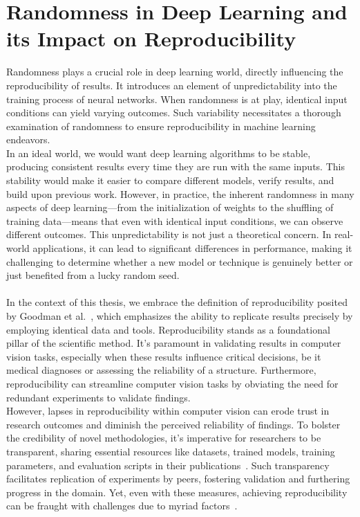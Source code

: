\section{Randomness in Deep Learning and its Impact on Reproducibility}
Randomness plays a crucial role in deep learning world, directly influencing the reproducibility of results. It introduces an element of unpredictability into the training process of neural networks. When randomness is at play, identical input conditions can yield varying outcomes. Such variability necessitates a thorough examination of randomness to ensure reproducibility in machine learning endeavors.\\

In an ideal world, we would want deep learning algorithms to be stable, producing consistent results every time they are run with the same inputs. This stability would make it easier to compare different models, verify results, and build upon previous work. However, in practice, the inherent randomness in many aspects of deep learning—from the initialization of weights to the shuffling of training data—means that even with identical input conditions, we can observe different outcomes. This unpredictability is not just a theoretical concern. In real-world applications, it can lead to significant differences in performance, making it challenging to determine whether a new model or technique is genuinely better or just benefited from a lucky random seed.\\
\\

In the context of this thesis, we embrace the definition of reproducibility posited by Goodman et al.~\cite{goodman:2016ca}, 
which emphasizes the ability to replicate results precisely by employing identical data and tools. Reproducibility stands 
as a foundational pillar of the scientific method. It's paramount in validating results in computer vision tasks, 
especially when these results influence critical decisions, be it medical diagnoses or assessing the reliability of a structure. 
Furthermore, reproducibility can streamline computer vision tasks by obviating the need for redundant experiments to validate 
findings.
\\

However, lapses in reproducibility within computer vision can erode trust in research outcomes and diminish the perceived 
reliability of findings. To bolster the credibility of novel methodologies, it's imperative for researchers to be transparent, 
sharing essential resources like datasets, trained models, training parameters, and evaluation scripts in their publications~\cite{haibe2020transparency}. 
Such transparency facilitates replication of experiments by peers, fostering validation and furthering progress in the domain. 
Yet, even with these measures, achieving reproducibility can be fraught with challenges due to myriad factors~\cite{chenetal}.
\\

